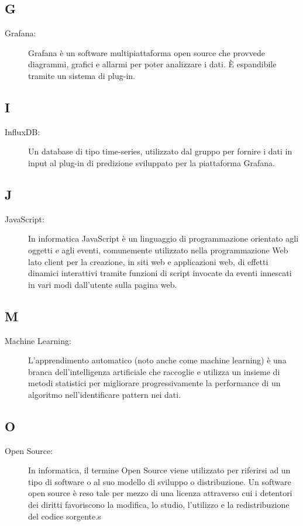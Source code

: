 \documentclass[../manuale-sviluppatore.tex]{subfiles}
\begin{document}
\subsection*{G}
\begin{description}
  \item[Grafana:] Grafana è un software multipiattaforma open source che provvede diagrammi, grafici e allarmi per poter analizzare i dati. È espandibile tramite un sistema di plug-in.
\end{description}

\subsection*{I}
\begin{description}
  \item [InfluxDB:] Un database di tipo time-series, utilizzato dal gruppo per fornire i dati in input al plug-in di predizione sviluppato per la piattaforma Grafana.
\end{description}

\subsection*{J}
\begin{description}
  \item[JavaScript:] In informatica JavaScript è un linguaggio di programmazione orientato agli oggetti e agli eventi, comunemente utilizzato nella programmazione Web lato client per la creazione, in siti web e applicazioni web, di effetti dinamici interattivi tramite funzioni di script invocate da eventi innescati in vari modi dall'utente sulla pagina web.
\end{description}

\subsection*{M}
\begin{description}
  \item[Machine Learning:] L’apprendimento automatico (noto anche come machine learning) è una branca dell'intelligenza artificiale che raccoglie e utilizza un insieme di metodi statistici per migliorare progressivamente la performance di un algoritmo nell'identificare pattern nei dati.
\end{description}

\subsection*{O}
\begin{description}
  \item[Open Source:] In informatica, il termine Open Source viene utilizzato per riferirsi ad un tipo di software o al suo modello di sviluppo o distribuzione. Un software open source è reso tale per mezzo di una licenza attraverso cui i detentori dei diritti favoriscono la modifica, lo studio, l'utilizzo e la redistribuzione del codice sorgente.s
\end{description}
\end{document}
